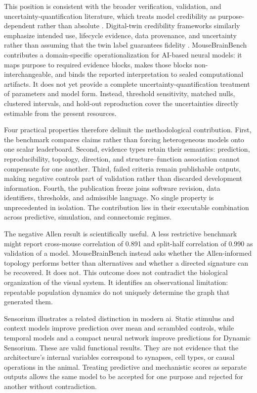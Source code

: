 This position is consistent with the broader verification, validation, and
uncertainty-quantification literature, which treats model credibility as
purpose-dependent rather than absolute
\citep{asme2018vv40,oberkampf2010verification,sargent2013verification,riedmaier2021vvuq}.
Digital-twin credibility frameworks similarly emphasize intended use,
lifecycle evidence, data provenance, and uncertainty rather than assuming
that the twin label guarantees fidelity
\citep{jones2020digitaltwin,rasheed2020digitaltwin,fuller2020digitaltwin,shao2022credibility}. MouseBrainBench contributes a
domain-specific operationalization for AI-based neural models: it maps purpose
to required evidence blocks, makes those blocks non-interchangeable, and binds
the reported interpretation to sealed computational artifacts. It does not yet
provide a complete uncertainty-quantification treatment of parameters and
model form. Instead, threshold sensitivity, matched nulls, clustered intervals,
and hold-out reproduction cover the uncertainties directly estimable from the
present resources.

Four practical properties therefore delimit the methodological contribution.
First, the benchmark compares claims rather than forcing heterogeneous models
onto one scalar leaderboard. Second, evidence types retain their semantics:
prediction, reproducibility, topology, direction, and structure--function
association cannot compensate for one another. Third, failed criteria remain
publishable outputs, making negative controls part of validation rather than
discarded development information. Fourth, the publication freeze joins
software revision, data identifiers, thresholds, and admissible language. No
single property is unprecedented in isolation. The contribution lies in their
executable combination across predictive, simulation, and connectomic regimes.

The negative Allen result is scientifically useful. A less restrictive
benchmark might report cross-mouse correlation of 0.891 and split-half
correlation of 0.990 as validation of a model. MouseBrainBench instead asks
whether the Allen-informed topology performs better than alternatives and
whether a directed signature can be recovered. It does not. This outcome does
not contradict the biological organization of the visual system. It identifies
an observational limitation: repeatable population dynamics do not uniquely
determine the graph that generated them.

Sensorium illustrates a related distinction in modern \acs{ai}.
Static stimulus and context models improve prediction over mean and scrambled
controls, while temporal models and a compact neural network improve predictions
for Dynamic Sensorium. These are valid functional results. They are not evidence
that the architecture's internal variables correspond to synapses, cell types,
or causal operations in the animal. Treating predictive and mechanistic scores
as separate outputs allows the same model to be accepted for one purpose and
rejected for another without contradiction.

